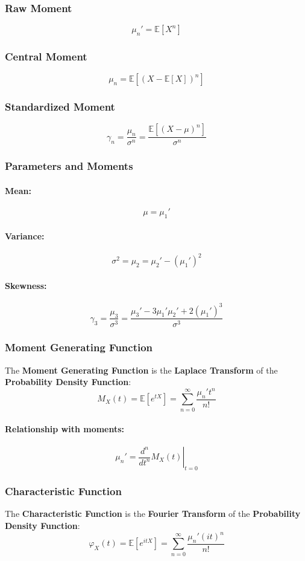 \documentclass{article}
\begin{document}
\subsubsection{Raw Moment}
\[
    \mu_n' = \mathbb{E}[X^n]
\]

\subsubsection{Central Moment}
\[
    \mu_n = \mathbb{E}[(X - \mathbb{E}[X])^n]
\]

\subsubsection{Standardized Moment}
\[
    \gamma_n = \frac{\mu_n}{\sigma^n} = \frac{\mathbb{E}[(X - \mu)^n]}{\sigma^n}
\]

\subsubsection{Parameters and Moments}
\paragraph{Mean:}
\[
    \mu = \mu_1'
\]
\paragraph{Variance:}
\[
    \sigma^2 = \mu_2 = \mu_2' - (\mu_1')^2
\]
\paragraph{Skewness:}
\[
    \gamma_3 = \frac{\mu_3}{\sigma^3} = \frac{\mu_3' - 3\mu_1'\mu_2' + 2(\mu_1')^3}{\sigma^3}
\]

\subsubsection{Moment Generating Function}
The \textbf{Moment Generating Function} is the \textbf{Laplace Transform} of the \textbf{Probability Density Function}:
\[
    M_X(t) = \mathbb{E}[e^{tX}] = \sum_{n=0}^{\infty} \frac{\mu_n' t^n}{n!}
\]
\paragraph{Relationship with moments:}
\[
    \mu_n' = \left.\frac{d^n}{dt^n} M_X(t)\right|_{t=0}
\]

\subsubsection{Characteristic Function}
The \textbf{Characteristic Function} is the \textbf{Fourier Transform} of the \textbf{Probability Density Function}:
\[
    \varphi_X(t) = \mathbb{E}[e^{itX}] = \sum_{n=0}^{\infty} \frac{\mu_n' (it)^n}{n!}
\]
\end{document}
